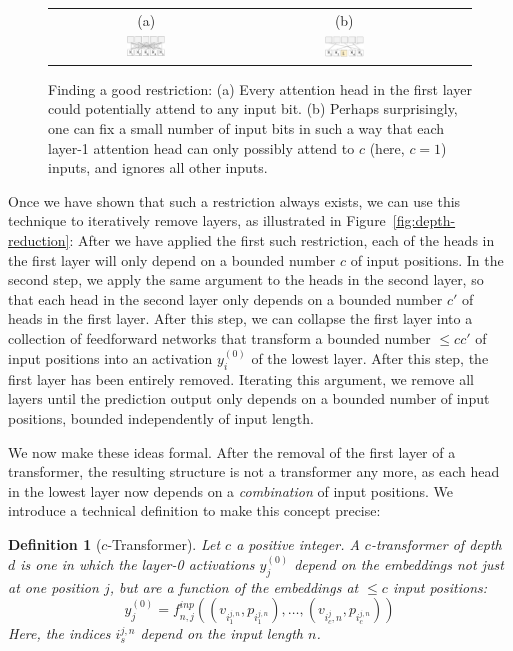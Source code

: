 \documentclass[11pt,a4paper]{article}
\newcounter{theorem}
\newtheorem{defin}[theorem]{Definition}
\begin{document}
\begin{figure}[ht]
    \centering
    \begin{tabular}{cccc}
    (a) & (b) \\
    \includegraphics[width=0.21\textwidth]{writeup/figures/restr-0.png} &
        \includegraphics[width=0.21\textwidth]{writeup/figures/restr-2.png}&
        \end{tabular}
	\caption{Finding a good restriction: (a) Every attention head in the first layer could potentially attend to any input bit. (b) Perhaps surprisingly, one can fix a small number of input bits in such a way that each layer-1 attention head can only possibly attend to $c$ (here, $c=1$) inputs, and ignores all other inputs.}
	\label{fig:restr}
\end{figure}

Once we have shown that such a restriction always exists, we can use this technique to iteratively remove layers, as illustrated in Figure~\ref{fig:depth-reduction}:
After we have applied the first such restriction, each of the heads in the first layer will only depend on a bounded number $c$ of input positions.
In the second step, we apply the same argument to the heads in the second layer, so that each head in the second layer only depends on a bounded number $c'$ of heads in the first layer.
After this step, we can collapse the first layer into a collection of feedforward networks that transform a bounded number $\leq cc'$ of input positions into an activation $y_i^{(0)}$ of the lowest layer.
After this step, the first layer has been entirely removed.
Iterating this argument, we remove all layers until the prediction output only depends on a bounded number of input positions, bounded independently of input length.

We now make these ideas formal.
After the removal of the first layer of a transformer, the resulting structure is not a transformer any more, as each head in the lowest layer now depends on a \emph{combination} of input positions.
We introduce a technical definition to make this concept precise:

\begin{defin}[$c$-Transformer]
Let $c$ a positive integer. A $c$-transformer of depth $d$ is one in which the layer-0 activations $y_j^{(0)}$ depend on the embeddings not just at one position $j$, but are a function of the embeddings at $\leq c$ input positions:
\begin{equation}
    y_j^{(0)} = f^{inp}_{n,j}((v_{i_1^{j,n}}, p_{i_1^{j,n}}), \dots, (v_{i_c^{j},n}, p_{i_c^{j,n}} ))
\end{equation}
Here, the indices ${i_s^{j,n}}$ depend on the input length $n$.
\end{defin}
\end{document}
